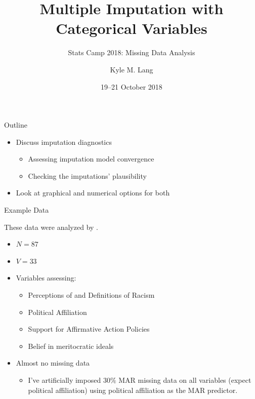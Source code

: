 \documentclass{beamer}\usepackage[]{graphicx}\usepackage[]{color}
\title{Multiple Imputation with Categorical Variables}
\subtitle{Stats Camp 2018: Missing Data Analysis}
\author{Kyle M. Lang}
\institute{Department of Methodology \& Statistics\\Tilburg University}
\date{19--21 October 2018}
\begin{document}




\begin{frame}[t,plain]
  
  \titlepage
  
\end{frame}


\begin{frame}{Outline}
  
  \begin{itemize}
  \item Discuss imputation diagnostics
    \vb
    \begin{itemize}
    \item Assessing imputation model convergence
      \vc
    \item Checking the imputations' plausibility
    \end{itemize}
    \vb
  \item Look at graphical and numerical options for both
  \end{itemize}
  
\end{frame}


\begin{frame}{Example Data}
  
  These data were analyzed by \citet{langEtAl:2009}.\\
  \begin{itemize}
  \item $N = 87$
  \item $V = 33$
  \item Variables assessing: 
    \begin{itemize}
    \item Perceptions of and Definitions of Racism
    \item Political Affiliation
    \item Support for Affirmative Action Policies
    \item Belief in meritocratic ideals
    \end{itemize}
    \vb
  \item Almost no missing data
    \begin{itemize}
    \item I've artificially imposed $30\%$ MAR missing data on all variables 
      (expect political affiliation) using political affiliation as the MAR 
      predictor.
    \end{itemize}
  \end{itemize}
  
\end{frame}
\end{document}
